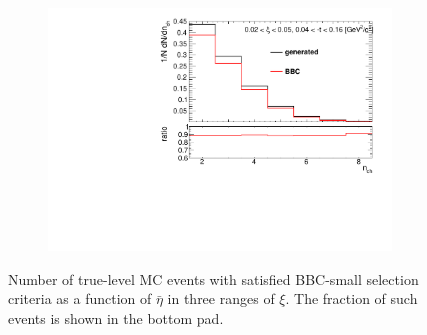 \begin{figure}[h!]
\begin{subfigure}{.45\textwidth}
	\end{subfigure}
	\begin{subfigure}{.45\textwidth}
		\includegraphics[width=\textwidth,page=11]{chapters/chrgSTAR/img/bbcCorrection/xi_bbc.pdf}
	\end{subfigure}
	\begin{minipage}{.45\textwidth}
		\caption[Number of true-level MC events with satisfied BBC-small selection criteria  as a function of $\bar{\eta}$ in three ranges of $\xi$]{Number of true-level MC events with satisfied BBC-small selection criteria  as a function of $\bar{\eta}$ in three ranges of $\xi$. The fraction of such events is shown in the bottom pad.}
		\label{fig:bbcCorection_eta}
	\end{minipage}
	
\end{figure}


